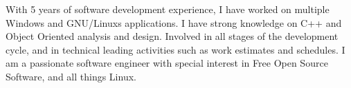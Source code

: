 

\begin{cvparagraph}

With 5 years of software development experience, I have worked on multiple Windows and GNU/Linuxs applications. I have strong knowledge on C++ and Object Oriented analysis and design. Involved in all stages of the development cycle, and in technical leading activities such as work estimates and schedules. I am a passionate software engineer with special interest in Free Open Source Software, and all things Linux.

\end{cvparagraph}
